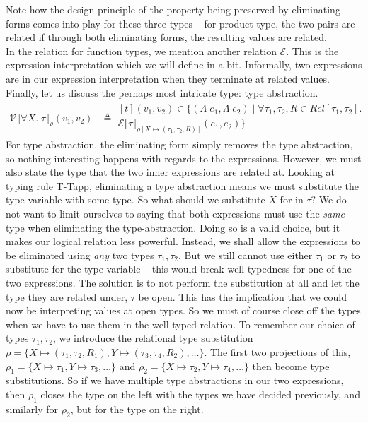 \documentclass[a4paper, 11pt]{report}
\theoremstyle{definition}
\newcommand{\expr}{e}
\newcommand{\val}{v}
\newcommand{\Tvar}{X}
\newcommand{\TvarB}{Y}
\newcommand{\Tlam}{\Lambda\;}
\newcommand{\Tall}[2]{\forall #1.\; #2}
\newcommand{\typ}{\tau}
\newcommand{\ValInp}[2]{\mathcal{V} \llbracket #1 \rrbracket_{#2}}
\newcommand{\ValInpGen}[2]{\ValInp{#1}{#2}(\val_1, \val_2)}
\newcommand{\ExpInp}[2]{\mathcal{E} \llbracket #1 \rrbracket_{#2}}
\newcommand{\map}[2]{#1 \mapsto #2}
\begin{document}
Note how the design principle of the property being preserved by eliminating forms comes into play for these three types – for product type, the two pairs are related if through both eliminating forms, the resulting values are related.\\
In the relation for function types, we mention another relation $\mathcal{E}$. This is the expression interpretation which we will define in a bit. Informally, two expressions are in our expression interpretation when they terminate at related values.\\
Finally, let us discuss the perhaps most intricate type: type abstraction.
\begin{align*}
  \ValInpGen{\Tall{\Tvar}{\typ}}{\rho}  &\triangleq 
  \begin{aligned}[t]
    (\val_1, \val_2) \in \{(\Tlam \expr_1, \Tlam \expr_2) \mid \forall \typ_1, \typ_2, R \in Rel[\typ_1, \typ_2] .\\
    \ExpInp{\typ}{\rho[\map{\Tvar}{(\typ_1, \typ_2, R)}]}(\expr_1, \expr_2)\}
  \end{aligned}
\end{align*}
For type abstraction, the eliminating form simply removes the type abstraction, so nothing interesting happens with regards to the expressions. However, we must also state the type that the two inner expressions are related at. Looking at typing rule T-Tapp, eliminating a type abstraction means we must substitute the type variable with some type. So what should we substitute $\Tvar$ for in $\typ$? We do not want to limit ourselves to saying that both expressions must use the \textit{same} type when eliminating the type-abstraction. Doing so is a valid choice, but it makes our logical relation less powerful. Instead, we shall allow the expressions to be eliminated using \textit{any} two types $\typ_1, \typ_2$. But we still cannot use either $\typ_1$ or $\typ_2$ to substitute for the type variable – this would break well-typedness for one of the two expressions. The solution is to not perform the substitution at all and let the type they are related under, $\typ$ be open. This has the implication that we could now be interpreting values at open types. So we must of course close off the types when we have to use them in the well-typed relation. To remember our choice of types $\typ_1, \typ_2$, we introduce the relational type substitution $\rho = \{\Tvar \mapsto (\typ_1, \typ_2, R_1), \TvarB \mapsto (\typ_3, \typ_4, R_2), \dots\}$. The first two projections of this, $\rho_1 = \{\Tvar \mapsto \typ_1, \TvarB \mapsto \typ_3, \dots\}$ and $\rho_2 = \{\Tvar \mapsto \typ_2, \TvarB \mapsto \typ_4, \dots \}$ then become type substitutions. So if we have multiple type abstractions in our two expressions, then $\rho_1$ closes the type on the left with the types we have decided previously, and similarly for $\rho_2$, but for the type on the right.\\
\end{document}
